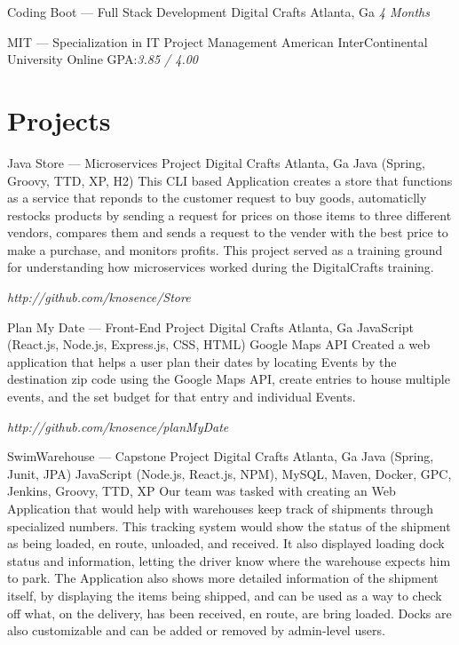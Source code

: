 \documentclass{resume-class/nadario_resume}
\begin{document}
        {Coding Boot --- Full Stack Development}
        {Digital Crafts}
        {Atlanta, Ga}
        {}{\textit{4 Months}}
        \vspace{.25cm}

        {MIT --- Specialization in IT Project Management}
        {American InterContinental University}
        {Online}
        {}{GPA:\textit{3.85 / 4.00}}
        \vspace{.25cm}

\section{Projects}
        {Java Store --- Microservices Project }
        {Digital Crafts}
        {Atlanta, Ga}
        {}{Java (Spring, Groovy, TTD, XP, H2)}
          \indent This CLI based Application creates a store that functions as a service that reponds to the customer request to buy goods, automaticlly restocks products by sending a request for prices on those items to three different vendors, compares them and sends a request to the vender with the best price to make a purchase, and monitors profits. This project served as a training ground for understanding how microservices worked during the DigitalCrafts training.

        {}{\textit{http://github.com/knosence/Store}}
        \vspace{.25cm}

        {Plan My Date --- Front-End Project}
        {Digital Crafts}
        {Atlanta, Ga}
        {}{JavaScript (React.js, Node.js, Express.js, CSS, HTML) Google Maps API}
          \indent Created a web application that helps a user plan their dates by locating Events by the destination zip code using the Google Maps API, create entries to house multiple events, and the set budget for that entry and individual Events.

        {}{\textit{http://github.com/knosence/planMyDate}}
        \vspace{.25cm}

        {SwimWarehouse --- Capstone Project}
        {Digital Crafts}
        {Atlanta, Ga}
        {}{Java (Spring, Junit, JPA) JavaScript (Node.js, React.js, NPM), MySQL, Maven, Docker, 
        GPC, Jenkins, Groovy, TTD, XP}
          \indent Our team was tasked with creating an Web Application that would help with warehouses keep track of shipments through specialized numbers. This tracking system would show the status of the shipment as being loaded, en route, unloaded, and received. It also displayed loading dock status and information, letting the driver know where the warehouse expects him to park. The Application also shows more detailed information of the shipment itself, by displaying the items being shipped, and can be used as a way to check off what, on the delivery, has been received, en route, are bring loaded. Docks are also customizable and can be added or removed by admin-level users.
\end{document}
